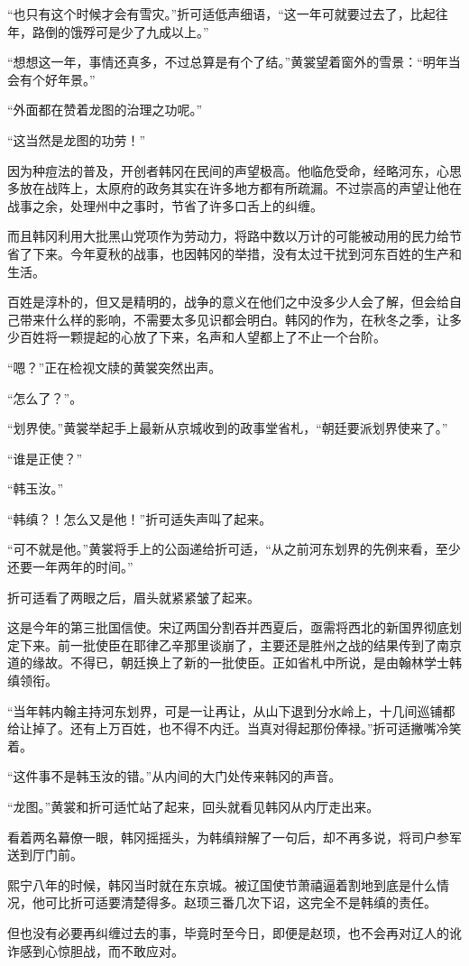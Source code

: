 “也只有这个时候才会有雪灾。”折可适低声细语，“这一年可就要过去了，比起往年，路倒的饿殍可是少了九成以上。”

“想想这一年，事情还真多，不过总算是有个了结。”黄裳望着窗外的雪景：“明年当会有个好年景。”

“外面都在赞着龙图的治理之功呢。”

“这当然是龙图的功劳！”

因为种痘法的普及，开创者韩冈在民间的声望极高。他临危受命，经略河东，心思多放在战阵上，太原府的政务其实在许多地方都有所疏漏。不过崇高的声望让他在战事之余，处理州中之事时，节省了许多口舌上的纠缠。

而且韩冈利用大批黑山党项作为劳动力，将路中数以万计的可能被动用的民力给节省了下来。今年夏秋的战事，也因韩冈的举措，没有太过干扰到河东百姓的生产和生活。

百姓是淳朴的，但又是精明的，战争的意义在他们之中没多少人会了解，但会给自己带来什么样的影响，不需要太多见识都会明白。韩冈的作为，在秋冬之季，让多少百姓将一颗提起的心放了下来，名声和人望都上了不止一个台阶。

“嗯？”正在检视文牍的黄裳突然出声。

“怎么了？”。

“划界使。”黄裳举起手上最新从京城收到的政事堂省札，“朝廷要派划界使来了。”

“谁是正使？”

“韩玉汝。”

“韩缜？！怎么又是他！”折可适失声叫了起来。

“可不就是他。”黄裳将手上的公函递给折可适，“从之前河东划界的先例来看，至少还要一年两年的时间。”

折可适看了两眼之后，眉头就紧紧皱了起来。

这是今年的第三批国信使。宋辽两国分割吞并西夏后，亟需将西北的新国界彻底划定下来。前一批使臣在耶律乙辛那里谈崩了，主要还是胜州之战的结果传到了南京道的缘故。不得已，朝廷换上了新的一批使臣。正如省札中所说，是由翰林学士韩缜领衔。

“当年韩内翰主持河东划界，可是一让再让，从山下退到分水岭上，十几间巡铺都给让掉了。还有上万百姓，也不得不内迁。当真对得起那份俸禄。”折可适撇嘴冷笑着。

“这件事不是韩玉汝的错。”从内间的大门处传来韩冈的声音。

“龙图。”黄裳和折可适忙站了起来，回头就看见韩冈从内厅走出来。

看着两名幕僚一眼，韩冈摇摇头，为韩缜辩解了一句后，却不再多说，将司户参军送到厅门前。

熙宁八年的时候，韩冈当时就在东京城。被辽国使节萧禧逼着割地到底是什么情况，他可比折可适要清楚得多。赵顼三番几次下诏，这完全不是韩缜的责任。

但也没有必要再纠缠过去的事，毕竟时至今日，即便是赵顼，也不会再对辽人的讹诈感到心惊胆战，而不敢应对。

